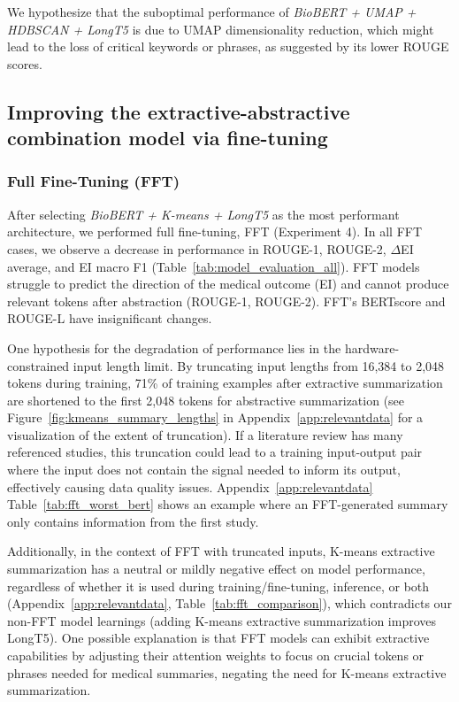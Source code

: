 \documentclass[11pt]{article}
\begin{document}
We hypothesize that the suboptimal performance of \textit{BioBERT + UMAP + HDBSCAN + LongT5} is due to UMAP dimensionality reduction, which might lead to the loss of critical keywords or phrases, as suggested by its lower ROUGE scores.

\subsection{Improving the extractive-abstractive combination model via fine-tuning}
\subsubsection{Full Fine-Tuning (FFT)}
After selecting \textit{BioBERT + K-means + LongT5} as the most performant architecture, we performed full fine-tuning, FFT (Experiment 4). In all FFT cases, we observe a decrease in performance in ROUGE-1, ROUGE-2, $\Delta$EI average, and EI macro F1 (Table~\ref{tab:model_evaluation_all}). FFT models struggle to predict the direction of the medical outcome (EI) and cannot produce relevant tokens after abstraction (ROUGE-1, ROUGE-2). FFT’s BERTscore and ROUGE-L have insignificant changes.

One hypothesis for the degradation of performance lies in the hardware-constrained input length limit. By truncating input lengths from 16,384 to 2,048 tokens during training, 71\% of training examples after extractive summarization are shortened to the first 2,048 tokens for abstractive summarization (see Figure~\ref{fig:kmeans_summary_lengths} in Appendix~\ref{app:relevantdata} for a visualization of the extent of truncation). If a literature review has many referenced studies, this truncation could lead to a training input-output pair where the input does not contain the signal needed to inform its output, effectively causing data quality issues. Appendix~\ref{app:relevantdata} Table~\ref{tab:fft_worst_bert} shows an example where an FFT-generated summary only contains information from the first study.

Additionally, in the context of FFT with truncated inputs, K-means extractive summarization has a neutral or mildly negative effect on model performance, regardless of whether it is used during training/fine-tuning, inference, or both (Appendix~\ref{app:relevantdata}, Table~\ref{tab:fft_comparison}), which contradicts our non-FFT model learnings (adding K-means extractive summarization improves LongT5). One possible explanation is that FFT models can exhibit extractive capabilities by adjusting their attention weights to focus on crucial tokens or phrases needed for medical summaries, negating the need for K-means extractive summarization.
\end{document}
